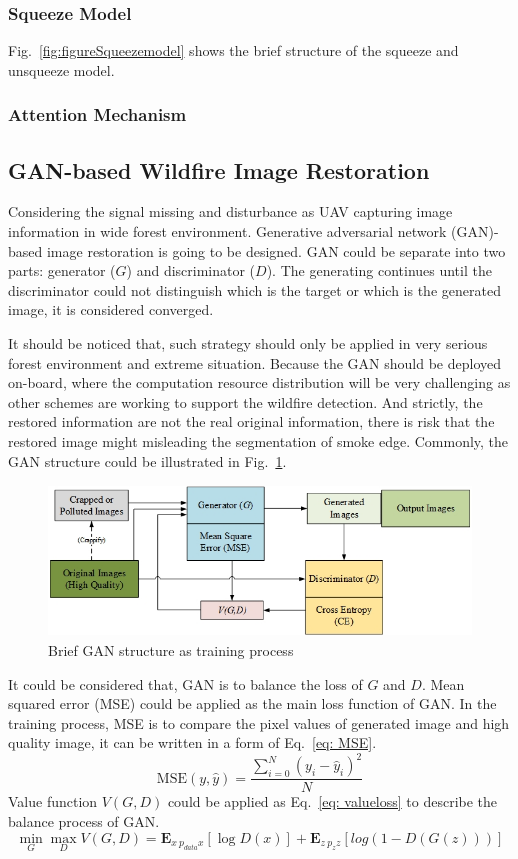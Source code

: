 \subsubsection{Squeeze Model}
Fig.~\ref{fig:figureSqueezemodel} shows the brief structure of the squeeze and unsqueeze model.

\subsubsection{Attention Mechanism}

\subsection{GAN-based Wildfire Image Restoration}
Considering the signal missing and disturbance as UAV capturing image information in wide forest environment. Generative adversarial network (GAN)-based image restoration is going to be designed. GAN could be separate into two parts: generator ($G$) and discriminator ($D$). The generating continues until the discriminator could not distinguish which is the target or which is the generated image, it is considered converged.\par
It should be noticed that, such strategy should only be applied in very serious forest environment and extreme situation. Because the GAN should be deployed on-board, where the computation resource distribution will be very challenging as other schemes are working to support the wildfire detection. And strictly, the restored information are not the real original information, there is risk that the restored image might misleading the segmentation of smoke edge.
Commonly, the GAN structure could be illustrated in Fig.~\ref{fig:figureGANmodel}.
\begin{figure}[ht]
    \centering
    \includegraphics[height=40mm]{figs/figureGANmodel.jpg}
    \caption{Brief GAN structure as training process}
    \label{fig:figureGANmodel}
\end{figure}
It could be considered that, GAN is to balance the loss of $G$ and $D$. Mean squared error (MSE) could be applied as the main loss function of GAN. In the training process, MSE is to compare the pixel values of generated image and high quality image, it can be written in a form of Eq.~\ref{eq: MSE}.
\begin{equation}
\text{MSE}(y, \hat y) =
\frac{\sum_{i=0}^N (y_i-\hat y_i)^2}{N}
\label{eq: MSE}
\end{equation}
Value function $V(G, D)$ could be applied as Eq.~\ref{eq: valueloss} to describe the balance process of GAN.
\begin{equation}
\min_G\max_D V(G,D)=
\mathbf{E}_{x~p_{data}{x}}[\log D(x)]+
\mathbf{E}_{z~p_z{z}}[log(1-D(G(z)))]
\label{eq: valueloss}
\end{equation}
